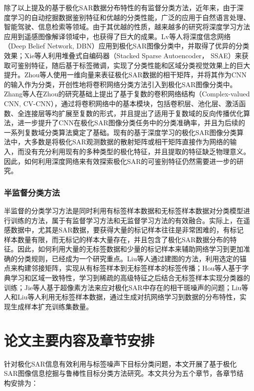 除了以上提及的基于极化SAR数据分布特性的有监督分类方法，近年来，由于深度学习的自动挖掘数据鉴别特征和优越的分类性能，广泛的应用于自然语言处理、智能驾驶、信息检索等领域。由于其优越的性质，越来越多的研究将深度学习方法应用到遥感图像解译领域中，也获得了巨大的成果。Lv等人将深度信念网络（Deep Belief Network, DBN）应用到极化SAR图像分类中，并取得了优异的分类效果；Xie等人利用堆叠式自编码器（Stacked Sparse Autoencoder， SSAE）来获取可鉴别特征，随后基于标签微调，实现了分类性能和区域分类视觉效果上的巨大提升。Zhou等人使用一维向量来表征极化SAR数据的相干矩阵，并将其作为CNN的输入作为分类，开创性地将卷积网络分类方法引入到极化SAR图像分类中。Zhang等人在Zhou的研究基础上提出了基于复数的卷积网络结构（Complex-valued CNN, CV-CNN），通过将卷积网络中的基本模块，包括卷积层、池化层、激活函数、全连接层等均扩展至复数的形式，并且提出了适用于复数域的反向传播优化算法，进一步提升了CNN在极化SAR图像分类任务中的分类准确率，并且为后续的一系列复数域分类算法奠定了基础。现有的基于深度学习的极化SAR图像分类算法中，大多数是将极化SAR观测数据的散射矩阵或相干矩阵直接作为网络的输入，而没有充分利用现有的多种类型的极化特征，并且提取的特征缺乏物理意义。因此，如何利用深度网络来有效探索极化SAR的可鉴别特征仍然需要进一步的研究。

\subsubsection{半监督分类方法}
半监督的分类学习方法是同时利用有标签样本数据和无标签样本数据对分类模型进行训练的方法，属于有监督学习方法和无监督学习方法的有效融合。实际上，在遥感数据中，尤其是SAR数据，要获得大量的标记样本往往是非常困难的，有标记样本数量有限，而无标记的样本大量存在，并且包含了极化SAR数据分布的特征。因此，如何利用大量的无标签数据和少量的标记样本来辅助网络学习到更加准确的分类规则，已经成为一个研究重点。Liu等人通过建图的方法，利用选定的锚点来构建邻接矩阵，实现从有标签样本到无标签样本的标签传播；Hou等人基于字典学习和区域一致特性，学习到稀疏的高级特征之后结合无标签样本实现分类器的训练；Jie等人基于超像素方法来应对极化SAR中存在的相干斑噪声的问题；Liu等人和Liu等人利用无标签样本数据，通过生成对抗网络学习到数据的分布特性，实现生成样本扩充训练集数量。

\section{论文主要内容及章节安排}
针对极化SAR信息有效利用与标签噪声下目标分类问题，本文开展了基于极化SAR图像信息挖掘与鲁棒性目标分类方法研究。本文共分为五个章节，各章节结构安排为：

